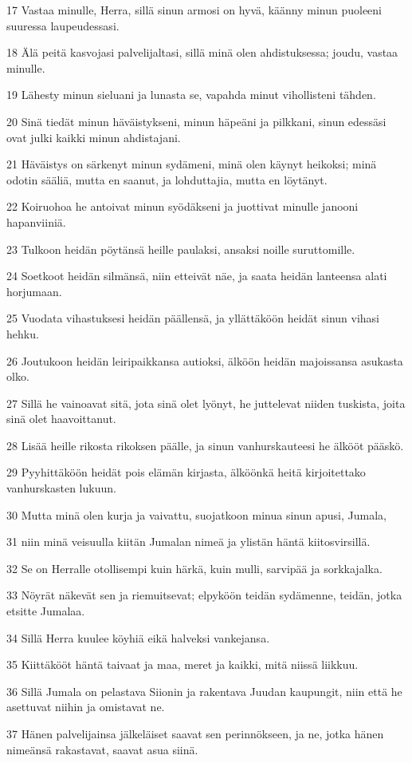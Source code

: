 \par 17 Vastaa minulle, Herra, sillä sinun armosi on hyvä, käänny minun puoleeni suuressa laupeudessasi.
\par 18 Älä peitä kasvojasi palvelijaltasi, sillä minä olen ahdistuksessa; joudu, vastaa minulle.
\par 19 Lähesty minun sieluani ja lunasta se, vapahda minut vihollisteni tähden.
\par 20 Sinä tiedät minun häväistykseni, minun häpeäni ja pilkkani, sinun edessäsi ovat julki kaikki minun ahdistajani.
\par 21 Häväistys on särkenyt minun sydämeni, minä olen käynyt heikoksi; minä odotin sääliä, mutta en saanut, ja lohduttajia, mutta en löytänyt.
\par 22 Koiruohoa he antoivat minun syödäkseni ja juottivat minulle janooni hapanviiniä.
\par 23 Tulkoon heidän pöytänsä heille paulaksi, ansaksi noille suruttomille.
\par 24 Soetkoot heidän silmänsä, niin etteivät näe, ja saata heidän lanteensa alati horjumaan.
\par 25 Vuodata vihastuksesi heidän päällensä, ja yllättäköön heidät sinun vihasi hehku.
\par 26 Joutukoon heidän leiripaikkansa autioksi, älköön heidän majoissansa asukasta olko.
\par 27 Sillä he vainoavat sitä, jota sinä olet lyönyt, he juttelevat niiden tuskista, joita sinä olet haavoittanut.
\par 28 Lisää heille rikosta rikoksen päälle, ja sinun vanhurskauteesi he älkööt pääskö.
\par 29 Pyyhittäköön heidät pois elämän kirjasta, älköönkä heitä kirjoitettako vanhurskasten lukuun.
\par 30 Mutta minä olen kurja ja vaivattu, suojatkoon minua sinun apusi, Jumala,
\par 31 niin minä veisuulla kiitän Jumalan nimeä ja ylistän häntä kiitosvirsillä.
\par 32 Se on Herralle otollisempi kuin härkä, kuin mulli, sarvipää ja sorkkajalka.
\par 33 Nöyrät näkevät sen ja riemuitsevat; elpyköön teidän sydämenne, teidän, jotka etsitte Jumalaa.
\par 34 Sillä Herra kuulee köyhiä eikä halveksi vankejansa.
\par 35 Kiittäkööt häntä taivaat ja maa, meret ja kaikki, mitä niissä liikkuu.
\par 36 Sillä Jumala on pelastava Siionin ja rakentava Juudan kaupungit, niin että he asettuvat niihin ja omistavat ne.
\par 37 Hänen palvelijainsa jälkeläiset saavat sen perinnökseen, ja ne, jotka hänen nimeänsä rakastavat, saavat asua siinä.

